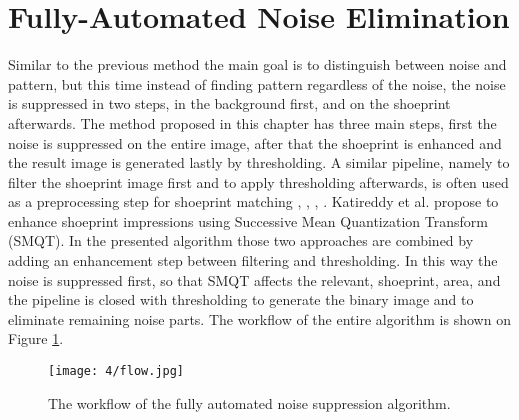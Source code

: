 \documentclass[draft,final]{vutinfth} %
\begin{document}
\section{Fully-Automated Noise Elimination}

\par
Similar to the previous method the main goal is to distinguish between noise and pattern, but this time instead of finding pattern regardless of the noise, the noise is suppressed in two steps, in the background first, and on the shoeprint afterwards.
The method proposed in this chapter has three main steps, first the noise is suppressed on the entire image, after that the shoeprint is enhanced and the result image is generated lastly by thresholding.
A similar pipeline, namely to filter the shoeprint image first and to apply thresholding afterwards, is  often used as a preprocessing step for shoeprint matching \cite{alizadeh2017automatic}, \cite{wang2014automatic}, \cite{li2014retrieval}, \cite{kong2014novel}.
Katireddy et al. \cite{katireddy2017novel} propose to enhance shoeprint impressions using Successive Mean Quantization Transform (SMQT).
In the presented algorithm those two approaches are combined by adding an enhancement step between filtering and thresholding.
In this way the noise is suppressed first, so that SMQT affects the relevant, shoeprint, area, and the pipeline is closed with thresholding to generate the binary image and to eliminate remaining noise parts.
The workflow of the entire algorithm is shown on Figure \ref{fig:fans:workflow}.

\begin{figure}[h]
  \centering
  \texttt{[image: 4/flow.jpg]}
  \caption{The workflow of the fully automated noise suppression algorithm.}
  \label{fig:fans:workflow} %
\end{figure}
\end{document}
